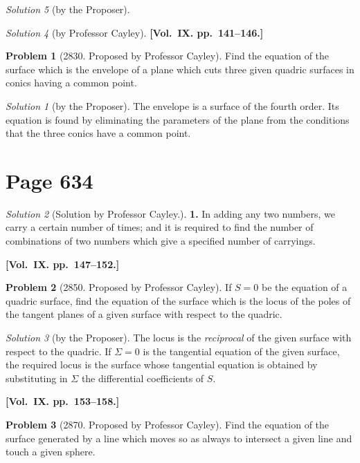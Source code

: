 \documentclass[12pt,a4paper]{article}
\theoremstyle{plain}
\theoremstyle{definition}
\newtheorem{problem}{Problem}
\theoremstyle{remark}
\newtheorem*{solution}{Solution}
\begin{document}
\begin{solution}[by the Proposer]
\begin{solution}[by Professor Cayley]
\medskip\noindent\textbf{[Vol.~IX. pp.~141--146.]}

\begin{problem}[2830. Proposed by Professor Cayley]
Find the equation of the surface which is the envelope of a plane which cuts three given quadric surfaces in conics having a common point.
\end{problem}

\begin{solution}[by the Proposer]
The envelope is a surface of the fourth order. Its equation is found by eliminating the parameters of the plane from the conditions that the three conics have a common point.
\end{solution}

\section*{Page 634}
\setcounter{page}{634}

\begin{solution}[Solution by Professor Cayley.]
\textbf{1.} In adding any two numbers, we carry a certain number of times; and it is required to find the number of combinations of two numbers which give a specified number of carryings.
\end{solution}

\medskip\noindent\textbf{[Vol.~IX. pp.~147--152.]}

\begin{problem}[2850. Proposed by Professor Cayley]
If $S = 0$ be the equation of a quadric surface, find the equation of the surface which is the locus of the poles of the tangent planes of a given surface with respect to the quadric.
\end{problem}

\begin{solution}[by the Proposer]
The locus is the \textit{reciprocal} of the given surface with respect to the quadric. If $\Sigma = 0$ is the tangential equation of the given surface, the required locus is the surface whose tangential equation is obtained by substituting in $\Sigma$ the differential coefficients of $S$.
\end{solution}

\medskip\noindent\textbf{[Vol.~IX. pp.~153--158.]}

\begin{problem}[2870. Proposed by Professor Cayley]
Find the equation of the surface generated by a line which moves so as always to intersect a given line and touch a given sphere.
\end{problem}


\end{solution}
\end{solution}
\end{document}
